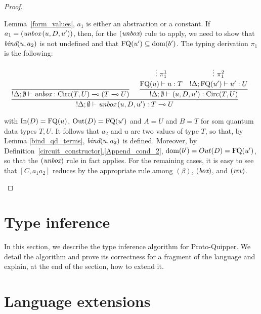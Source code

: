 \documentclass[twoside]{article}
\begin{document}
\begin{proof}
\begin{enumerate}
\begin{itemize}
    Lemma~\hyperref[form_values]{\ref*{form_values}}, $a_1$ is either 
    an abstraction or a constant. If $a_1=(\mathop{\textit{unbox}}\nolimits\,(u,D,u'))$, then, 
    for the $(\mathop{\textit{unbox}}\nolimits)$ rule to apply, we need to show that 
    $\mathop{\textit{bind}}\nolimits(u,a_2)$ is not undefined and that $\mathop{\textrm{FQ}}\nolimits(u')\subseteq\mathop{\textrm{\rm dom}}\nolimits(b')$.  
    The typing derivation $\pi_1$ is the following:
    \begin{footnotesize}
    \[
      \infer[]{{!}\Delta;\emptyset\entails \unbox\,(u,D,u'):T\loli U}{
        \infer[]{{!}\Delta;\emptyset \entails \unbox:\Circ(T,U)\loli (T\loli U)}{
        }   
        &
        \infer[]{{!}\Delta ;\emptyset\entails (u,D,u'):\Circ(T,U)}{
          \deduce[]{\FQ(u)\entails u:T}{
            \vdots ~\pi_1^1
          }
          &
          \deduce[]{{!}\Delta;\FQ(u')\entails u':U}{
            \vdots ~\pi_1^2     
          }
        }
      }
      \]
    \end{footnotesize}%
    with $\mathop{\textrm{In}}\nolimits(D)=\mathop{\textrm{FQ}}\nolimits(u)$, $\mathop{\textrm{Out}}\nolimits(D)=\mathop{\textrm{FQ}}\nolimits(u')$ and $A=U$ and $B=T$ for som quantum 
    data types $T,U$. It follows that $a_2$ and $u$ are two values of type $T$, 
    so that, by Lemma \hyperref[bind_qd_terms]{\ref*{bind_qd_terms}}, $\mathop{\textit{bind}}\nolimits(u,a_2)$
    is defined. Moreover, by Definition~\hyperref[Append_cond_2]
    {\ref*{circuit_constructor}.\ref*{Append_cond_2}}, $\mathop{\textrm{\rm dom}}\nolimits(b')=Out(D)
    =\mathop{\textrm{FQ}}\nolimits(u')$, so that the $(\mathop{\textit{unbox}}\nolimits)$ rule in fact applies. For the remaining cases, 
    it is easy to see that $[C,a_1a_2]$ reduces by the appropriate rule among $(\beta)$, 
    $(\mathop{\textit{box}}\nolimits)$, and $(\mathop{\textit{rev}}\nolimits)$. 
  \end{itemize}
\end{enumerate}
\end{proof}

\clearpage
\section{Type inference}\label{sec-inference}

In this section, we describe the type inference algorithm 
for Proto-Quipper. We detail the algorithm and prove its 
correctness for a fragment of the language and explain, 
at the end of the section, how to extend it.




\clearpage
\section{Language extensions}
\label{sec-extensions}
\end{document}
